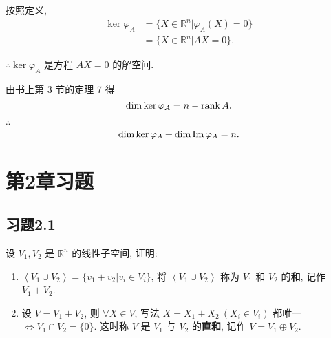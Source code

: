 \documentclass[color=black,device=normal,lang=cn,mode=geye]{elegantnote}
\begin{document}
按照定义,
\begin{align*}
    \ker\varphi_A & =\{X\in\mathbb{R}^n|\varphi_A(X)=0\} \\
    & =\{X\in\mathbb{R}^n|AX=0\}.
\end{align*}

$\therefore\ker\varphi_A$ 是方程 $AX=0$ 的解空间.

由书上第 3 节的定理 7 得
\[\dim\ker\varphi_A=n-\operatorname{rank} A.\]

$\therefore$
\[\dim\ker\varphi_A+\dim\operatorname{Im} \varphi_A=n.\]
\section{第2章习题}
\subsection{习题2.1}
\begin{exercise}[有改动]\label{ex1.1}
    设 $V_1,V_2$ 是 $\mathbb{R}^n$ 的线性子空间, 证明:
    \begin{enumerate}
        \def\labelenumi{(\arabic{enumi})}
        \item $\left<V_1\cup V_2\right>=\{v_1+v_2|v_i\in V_i\}$, 将 $\left<V_1\cup V_2\right>$ 称为 $V_1$ 和 $V_2$ 的\textbf{和}, 记作 $V_1+V_2$.
        \item 设 $V=V_1+V_2$, 则 $\forall X\in V$, 写法 $X=X_1+X_2\ (X_i\in V_i)$ 都唯一 $\Leftrightarrow V_1\cap V_2=\{0\}$. 这时称 $V$ 是 $V_1$ 与 $V_2$ 的\textbf{直和}, 记作 $V=V_1\oplus V_2$.
    \end{enumerate}
\end{exercise}
\end{document}
